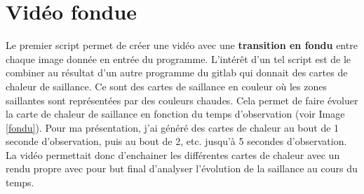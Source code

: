 \section{Vidéo fondue}

Le premier script permet de créer une vidéo avec une \textbf{transition en fondu} entre chaque image donnée en entrée du programme. L'intérêt d'un tel script est de le combiner au résultat d'un autre programme du gitlab qui donnait des cartes de chaleur de saillance. Ce sont des cartes de saillance en couleur où les zones saillantes sont représentées par des couleurs chaudes. Cela permet de faire évoluer la carte de chaleur de saillance en fonction du temps d'observation (voir Image \ref{fondu}). Pour ma présentation, j'ai généré des cartes de chaleur au bout de 1 seconde d'observation, puis au bout de 2, etc. jusqu'à 5 secondes d'observation. La vidéo permettait donc d'enchainer les différentes cartes de chaleur avec un rendu propre avec pour but final d'analyser l'évolution de la saillance au cours du temps.

